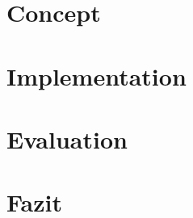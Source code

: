 \documentclass[12pt,a4paper,twoside]{report}
\theoremstyle{definition}
\begin{document}
	\chapter{Concept}
	\label{ch:Konzept}  	
		
    \cleardoublepage    
    
    \chapter{Implementation}
    \label{ch:implementierung}   
   		
   		
    \chapter{Evaluation}
	\label{ch:Bewertung}  
		
    \cleardoublepage    

    \chapter{Fazit}
    \label{ch:Fazit}    
    	
    \cleardoublepage
    

%

		
		\cleardoublepage
    \appendix

%    
		\cleardoublepage

    \listoftables
    	\cleardoublepage
    \listoffigures
    	\cleardoublepage
    \printindex
    	\cleardoublepage
    \printnomenclature
    \renewcommand{\leftmark}{\uppercase{Abkürzungsverzeichnis}}
    	\cleardoublepage
\end{document}
